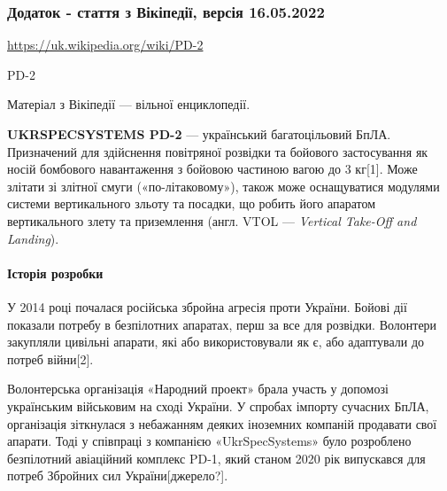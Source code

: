  
 
 
 
 

\subsubsection{Додаток - стаття з Вікіпедії, версія 16.05.2022}

\url{https://uk.wikipedia.org/wiki/PD-2}


PD-2

Матеріал з Вікіпедії — вільної енциклопедії.

\textbf{UKRSPECSYSTEMS PD-2} — український багатоцільовий БпЛА. Призначений для
здійснення повітряної розвідки та бойового застосування як носій бомбового
навантаження з бойовою частиною вагою до 3 кг[1]. Може злітати зі злітної смуги
(«по-літаковому»), також може оснащуватися модулями системи вертикального
зльоту та посадки, що робить його апаратом вертикального злету та приземлення
(англ. VTOL — \emph{Vertical Take-Off and Landing}).


\paragraph{Історія розробки}

У 2014 році почалася російська збройна агресія проти України. Бойові дії
показали потребу в безпілотних апаратах, перш за все для розвідки. Волонтери
закупляли цивільні апарати, які або використовували як є, або адаптували до
потреб війни[2].


Волонтерська організація «Народний проект» брала участь у допомозі українським
військовим на сході України. У спробах імпорту сучасних БпЛА, організація
зіткнулася з небажанням деяких іноземних компаній продавати свої апарати. Тоді
у співпраці з компанією «UkrSpecSystems» було розроблено безпілотний авіаційний
комплекс PD-1, який станом 2020 рік випускався для потреб Збройних сил
України[джерело?].

